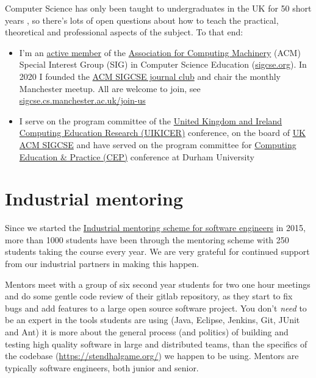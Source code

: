\documentclass[
  12pt,
]{book}
\providecommand{\tightlist}{%
  \setlength{\itemsep}{0pt}\setlength{\parskip}{0pt}}
\begin{document}
Computer Science has only been taught to undergraduates in the UK for 50 short years \citep{babygrowsup, sigcse50}, so there's lots of open questions about how to teach the practical, theoretical and professional aspects of the subject. To that end:

\begin{itemize}
\tightlist
\item
  I'm an \href{https://dl.acm.org/author_page.cfm?id=81350580198}{active member} of the \href{https://en.wikipedia.org/wiki/Association_for_Computing_Machinery}{Association for Computing Machinery} (ACM) Special Interest Group (SIG) in Computer Science Education (\href{https://sigcse.org}{sigcse.org}). In 2020 I founded the \href{https://sigcse.cs.manchester.ac.uk/}{ACM SIGCSE journal club} and chair the monthly Manchester meetup. All are welcome to join, see \href{https://sigcse.cs.manchester.ac.uk/join-us}{sigcse.cs.manchester.ac.uk/join-us}
\item
  I serve on the program committee of the \href{https://www.ukicer.com/}{United Kingdom and Ireland Computing Education Research (UIKICER)} conference, on the board of \href{https://uki-sigcse.acm.org/about}{UK ACM SIGCSE} and have served on the program committee for \href{http://community.dur.ac.uk/cep.conference}{Computing Education \& Practice (CEP)} conference at Durham University
\end{itemize}

\hypertarget{industrial-mentoring}{%
\section{Industrial mentoring}\label{industrial-mentoring}}

Since we started the \href{https://www.cs.manchester.ac.uk/connect/business-engagement/industrial-mentoring/}{Industrial mentoring scheme for software engineers} in 2015, more than 1000 students have been through the mentoring scheme with 250 students taking the course every year. We are very grateful for continued support from our industrial partners in making this happen.

Mentors meet with a group of six second year students for two one hour meetings and do some gentle code review of their gitlab repository, as they start to fix bugs and add features to a large open source software project. You don't \emph{need} to be an expert in the tools students are using (Java, Eclipse, Jenkins, Git, JUnit and Ant) it is more about the general process (and politics) of building and testing high quality software in large and distributed teams, than the specifics of the codebase (\url{https://stendhalgame.org/}) we happen to be using. Mentors are typically software engineers, both junior and senior.
\end{document}
